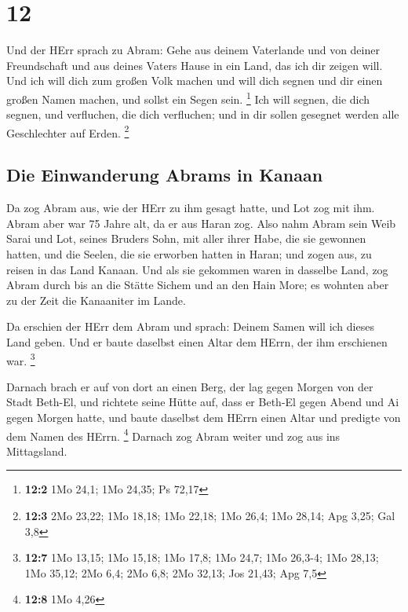 \hypertarget{section-11}{%
\section{12}\label{section-11}}

 Und der HErr sprach zu Abram: Gehe aus deinem Vaterlande
und von deiner Freundschaft und aus deines Vaters Hause in ein Land, das
ich dir zeigen will.  Und ich will dich zum großen Volk
machen und will dich segnen und dir einen großen Namen machen, und
sollst ein Segen sein. \footnote{\textbf{12:2} 1Mo 24,1; 1Mo 24,35; Ps
  72,17}  Ich will segnen, die dich segnen, und
verfluchen, die dich verfluchen; und in dir sollen gesegnet werden alle
Geschlechter auf Erden. \footnote{\textbf{12:3} 2Mo 23,22; 1Mo 18,18;
  1Mo 22,18; 1Mo 26,4; 1Mo 28,14; Apg 3,25; Gal 3,8}

\hypertarget{die-einwanderung-abrams-in-kanaan}{%
\subsection{Die Einwanderung Abrams in
Kanaan}\label{die-einwanderung-abrams-in-kanaan}}

 Da zog Abram aus, wie der HErr zu ihm gesagt hatte, und
Lot zog mit ihm. Abram aber war 75 Jahre alt, da er aus Haran zog.
 Also nahm Abram sein Weib Sarai und Lot, seines Bruders
Sohn, mit aller ihrer Habe, die sie gewonnen hatten, und die Seelen, die
sie erworben hatten in Haran; und zogen aus, zu reisen in das Land
Kanaan. Und als sie gekommen waren in dasselbe Land,  zog
Abram durch bis an die Stätte Sichem und an den Hain More; es wohnten
aber zu der Zeit die Kanaaniter im Lande.

 Da erschien der HErr dem Abram und sprach: Deinem Samen
will ich dieses Land geben. Und er baute daselbst einen Altar dem HErrn,
der ihm erschienen war. \footnote{\textbf{12:7} 1Mo 13,15; 1Mo 15,18;
  1Mo 17,8; 1Mo 24,7; 1Mo 26,3-4; 1Mo 28,13; 1Mo 35,12; 2Mo 6,4; 2Mo
  6,8; 2Mo 32,13; Jos 21,43; Apg 7,5}

 Darnach brach er auf von dort an einen Berg, der lag
gegen Morgen von der Stadt Beth-El, und richtete seine Hütte auf, dass
er Beth-El gegen Abend und Ai gegen Morgen hatte, und baute daselbst dem
HErrn einen Altar und predigte von dem Namen des HErrn. \footnote{\textbf{12:8}
  1Mo 4,26}  Darnach zog Abram weiter und zog aus ins
Mittagsland.

